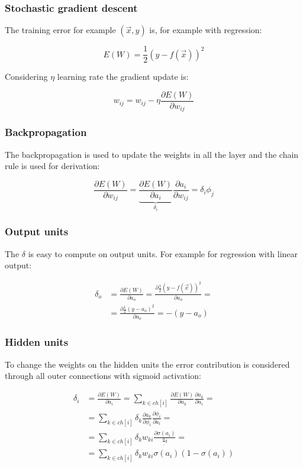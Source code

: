 		\subsubsection{Stochastic gradient descent}
		The training error for example $(\vec{x},y)$ is, for example with regression:

		$$E(W) = \frac{1}{2}(y-f(\vec{x}))^2$$

		Considering $\eta$ learning rate the gradient update is:

		$$w_{ij} = w_{ij}-\eta\frac{\partial E(W)}{\partial w_{ij}}$$

		\subsubsection{Backpropagation}
		The backpropagation is used to update the weights in all the layer and the chain rule is used for derivation:

		$$\frac{\partial E(W)}{\partial w_{ij}} = \underbrace{\frac{\partial E(W)}{\partial a_i}}_{\delta_i}\frac{\partial a_i}{\partial w_{ij}} = \delta_i\phi_j$$

		\subsubsection{Output units}
		The $\delta$ is easy to compute on output units.
		For example for regression with linear output:

		\begin{align*}
			\delta_o &= \frac{\partial E(W)}{\partial a_o} = \frac{\partial\frac{1}{2}(y-f(\vec{x}))^2}{\partial a_o}=\\
				 &=\frac{\partial \frac{1}{2}(y-a_o)^2}{\partial a_o} = -(y-a_o)
		\end{align*}

		\subsubsection{Hidden units}
		To change the weights on the hidden units the error contribution is considered through all outer connections with sigmoid activation:

		\begin{align*}
			\delta_i &= \frac{\partial E(W)}{\partial a_i}  = \sum\limits_{k\in ch[i]}\frac{\partial E(W)}{\partial a_k}\frac{\partial a_k}{\partial a_i}=\\
				 &=\sum\limits_{k\in ch[i]} \delta_k\frac{\partial a_k}{\partial\phi_i}\frac{\partial\phi_i}{\partial a_l}=\\
				 &=\sum\limits_{k\in ch[i]}\delta_kw_{ki}\frac{\partial\sigma(a_i)}{\frac a_i}=\\
				 &=\sum\limits_{k\in ch[i]}\delta_kw_{ki}\sigma(a_i)(1-\sigma(a_i))
		\end{align*}

